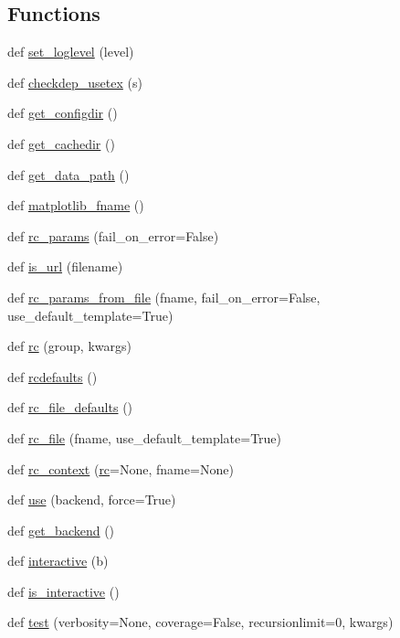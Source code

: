 \subsection*{Functions}
\begin{DoxyCompactItemize}
\item 
def \hyperlink{namespacematplotlib_a94c699cfaea1ae4b7804dda4ef2e42e3}{set\+\_\+loglevel} (level)
\item 
def \hyperlink{namespacematplotlib_ae3f7a6228bd1dfa27450b84c15a72622}{checkdep\+\_\+usetex} (s)
\item 
def \hyperlink{namespacematplotlib_a11f4d6a19e0e0713ebabacc8ececcad3}{get\+\_\+configdir} ()
\item 
def \hyperlink{namespacematplotlib_a18b054937ee2f63168bd0a53003961d5}{get\+\_\+cachedir} ()
\item 
def \hyperlink{namespacematplotlib_abefd06dc245b2239a4e6eae74a5c60df}{get\+\_\+data\+\_\+path} ()
\item 
def \hyperlink{namespacematplotlib_a9015b2634e8d2968848f7fda64436242}{matplotlib\+\_\+fname} ()
\item 
def \hyperlink{namespacematplotlib_af635acac141b4caa451dd53c94109c07}{rc\+\_\+params} (fail\+\_\+on\+\_\+error=False)
\item 
def \hyperlink{namespacematplotlib_a617194912be38b02290e2ede1d18edf5}{is\+\_\+url} (filename)
\item 
def \hyperlink{namespacematplotlib_abeb932db9ebc701d700b548f24f47809}{rc\+\_\+params\+\_\+from\+\_\+file} (fname, fail\+\_\+on\+\_\+error=False, use\+\_\+default\+\_\+template=True)
\item 
def \hyperlink{namespacematplotlib_a16931c23a19f81a6b22a97ec0bca1c1c}{rc} (group, kwargs)
\item 
def \hyperlink{namespacematplotlib_a28b1fc62c2abee97ce803d8238bacd67}{rcdefaults} ()
\item 
def \hyperlink{namespacematplotlib_abab7e1391fed4a96aba56fa0f1ad9fe9}{rc\+\_\+file\+\_\+defaults} ()
\item 
def \hyperlink{namespacematplotlib_aabe501013cd5d503cbb1aca4e0c0141e}{rc\+\_\+file} (fname, use\+\_\+default\+\_\+template=True)
\item 
def \hyperlink{namespacematplotlib_a72f32e32fe5a555b733ea38fc472335e}{rc\+\_\+context} (\hyperlink{namespacematplotlib_a16931c23a19f81a6b22a97ec0bca1c1c}{rc}=None, fname=None)
\item 
def \hyperlink{namespacematplotlib_a1b7516c119dd87a49d3063f1601c8349}{use} (backend, force=True)
\item 
def \hyperlink{namespacematplotlib_a4c414ede927e60a4232f5b74394dd30f}{get\+\_\+backend} ()
\item 
def \hyperlink{namespacematplotlib_aa54ae7131f356c434ad340da03b7daa2}{interactive} (b)
\item 
def \hyperlink{namespacematplotlib_a565795d222b6e75d08b543fc1b5cda27}{is\+\_\+interactive} ()
\item 
def \hyperlink{namespacematplotlib_a26dc2f19a2e629436aac80fae8ecee84}{test} (verbosity=None, coverage=False, recursionlimit=0, kwargs)
\end{DoxyCompactItemize}

